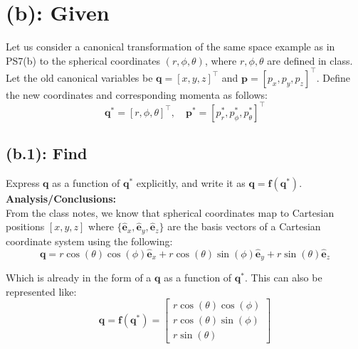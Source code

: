 \documentclass[titlepage]{article}
\begin{document}
\newpage

\section*{(b): Given}

Let us consider a canonical transformation of the same space example as in PS7(b) to the spherical coordinates $(r,\phi,\theta)$, where $r,\phi,\theta$ are defined in class. Let the old canonical variables be $\boldsymbol{q}=[x,y,z]^\top$ and $\boldsymbol{p}=[p_x,p_y,p_z]^\top$. Define the new coordinates and corresponding momenta as follows:
\begin{equation}
	\boldsymbol{q}^*=[r,\phi,\theta]^\top,\quad\boldsymbol{p}^*=[p_r^*,p_\phi^*,p_\theta^*]^\top
\end{equation}

\subsection*{(b.1): Find}

Express $\boldsymbol{q}$ as a function of $\boldsymbol{q}^*$ explicitly, and write it as $\boldsymbol{q}=\boldsymbol{f}(\boldsymbol{q}^*)$. \\

\textbf{Analysis/Conclusions:} \\

From the class notes, we know that spherical coordinates map to Cartesian positions $[x,y,z]$ where $\{\hat{\boldsymbol{e}}_x,\hat{\boldsymbol{e}}_y,\hat{\boldsymbol{e}}_z\}$ are the basis vectors of a Cartesian coordinate system using the following:
\begin{equation}
	\boldsymbol{q}=r\cos(\theta)\cos(\phi)\hat{\boldsymbol{e}}_x+r\cos(\theta)\sin(\phi)\hat{\boldsymbol{e}}_y+r\sin(\theta)\hat{\boldsymbol{e}}_z
\end{equation}

\begin{mdframed}[linewidth=1pt, innertopmargin=10pt, innerbottommargin=10pt]
	Which is already in the form of a $\boldsymbol{q}$ as a function of $\boldsymbol{q}^*$. This can also be represented like:
	\begin{equation}
		\boldsymbol{q}=\boldsymbol{f}(\boldsymbol{q}^*)=
		\begin{bmatrix}
			r\cos(\theta)\cos(\phi) \\
			r\cos(\theta)\sin(\phi) \\
			r\sin(\theta)
		\end{bmatrix}
		\label{eq:qrelation}
	\end{equation}
\end{mdframed}
\end{document}

